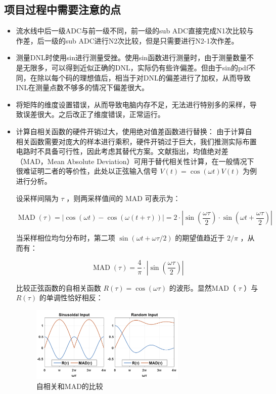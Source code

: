 \documentclass[cs4size,a4paper]{ctexart}
\numberwithin{equation}{section}
\numberwithin{table}{section}
\numberwithin{figure}{section}
\begin{document}
		\subsection{项目过程中需要注意的点}
		\begin{itemize}
			\item 流水线中后一级ADC与前一级不同，前一级的sub ADC直接完成N1次比较与作差，后一级的sub ADC进行N2次比较，但是只需要进行N2-1次作差。
			
			\item 测量DNL时使用sin进行测量受挫。使用sin函数进行测量时，由于测量数量不是无限多，可以得到近似正确的DNL，实际仍有些许偏差。但由于sin的pdf不同，在除以每个码的理想值后，相当于对DNL的偏差进行了加权，从而导致INL在测量点数不够多的情况下偏差很大。
			
			\item 将矩阵的维度设置错误，从而导致电脑内存不足，无法进行特别多的采样，导致误差很大。之后改正了维度错误，正常运行。
			
			\item 计算自相关函数的硬件开销过大，使用绝对值差函数进行替换：
			由于计算自相关函数需要对庞大的样本进行乘积，硬件开销过于巨大，我们推测实际布置电路时不具备可行性，因此考虑其替代方案。文献\cite{ref3}指出，均值绝对差（MAD，Mean Absolute Deviation）可用于替代相关性计算，在一般情况下很难证明二者的等价性，此处以正弦输入信号 $V(t)=\cos (\omega t) V(t)$ 为例进行分析。
			
			设采样间隔为 $\tau$ ，则两采样值间的 MAD 可表示为：
			
			$$
			\operatorname{MAD}(\tau)=|\cos (\omega t)-\cos (\omega(t+\tau))|=2 \cdot\left|\sin \left(\frac{\omega \tau}{2}\right) \cdot \sin \left(\omega t+\frac{\omega \tau}{2}\right)\right|
			$$
			
			
			当采样相位均匀分布时，第二项 $\sin (\omega t+\omega \tau / 2)$ 的期望值趋近于 $2 / \pi$ ，从而有：
			
			$$
			\operatorname{MAD}(\tau)=\frac{4}{\pi} \cdot\left|\sin \left(\frac{\omega \tau}{2}\right)\right|
			$$
			
			
			比较正弦函数的自相关函数 $R(\tau)=\cos (\omega \tau)$ 的波形。显然MAD（ $\tau$ ）与 $R(\tau)$ 的单调性恰好相反：
			
			\begin{figure}[H]
				\centering
				\includegraphics[width=0.7\textwidth]{figure/feeling1.png}
				\caption{自相关和MAD的比较} 
				\label{fig:feeling1}
			\end{figure}
			

\end{itemize}
\end{document}
